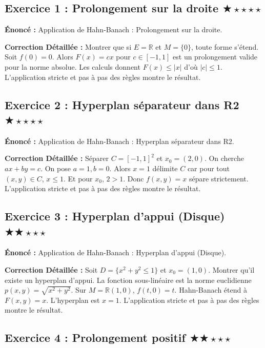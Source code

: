 \documentclass[11pt,a4paper]{article}
\begin{document}
\subsection*{Exercice 1 : Prolongement sur la droite \quad $\bigstar\star\star\star\star$}

\textbf{Énoncé :}
Application de Hahn-Banach : Prolongement sur la droite.

\textbf{Correction Détaillée :}
Montrer que si $E=\mathbb{R}$ et $M=\{0\}$, toute forme s'étend. Soit $f(0)=0$. Alors $F(x) = cx$ pour $c \in [-1, 1]$ est un prolongement valide pour la norme absolue. Les calculs donnent $F(x) \le |x|$ d'où $|c| \le 1$.
L'application stricte et pas à pas des règles montre le résultat.


\subsection*{Exercice 2 : Hyperplan séparateur dans R2 \quad $\bigstar\star\star\star\star$}

\textbf{Énoncé :}
Application de Hahn-Banach : Hyperplan séparateur dans R2.

\textbf{Correction Détaillée :}
Séparer $C = [-1, 1]^2$ et $x_0 = (2, 0)$. On cherche $ax+by=c$. On pose $a=1, b=0$. Alors $x=1$ délimite $C$ car pour tout $(x,y) \in C$, $x \le 1$. Et pour $x_0$, $2 > 1$. Donc $f(x,y)=x$ sépare strictement.
L'application stricte et pas à pas des règles montre le résultat.


\subsection*{Exercice 3 : Hyperplan d'appui (Disque) \quad $\bigstar\bigstar\star\star\star$}

\textbf{Énoncé :}
Application de Hahn-Banach : Hyperplan d'appui (Disque).

\textbf{Correction Détaillée :}
Soit $D = \{x^2+y^2 \le 1\}$ et $x_0=(1,0)$. Montrer qu'il existe un hyperplan d'appui. La fonction sous-linéaire est la norme euclidienne $p(x,y) = \sqrt{x^2+y^2}$. Sur $M=\mathbb{R}(1,0)$, $f(t,0)=t$. Hahn-Banach étend à $F(x,y)=x$. L'hyperplan est $x=1$.
L'application stricte et pas à pas des règles montre le résultat.


\subsection*{Exercice 4 : Prolongement positif \quad $\bigstar\bigstar\star\star\star$}
\end{document}

